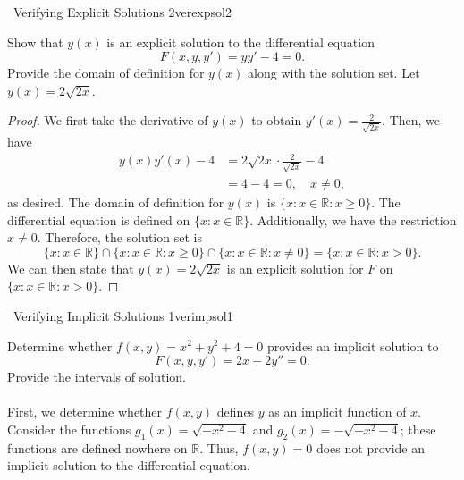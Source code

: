         \begin{example}{\Difficulty\,\Difficulty\,\,Verifying Explicit Solutions 2}{verexpsol2}
        
            Show that \(y(x)\) is an explicit solution to the differential equation
            \begin{equation*}
                F(x,y,y')=yy'-4=0.
            \end{equation*}
            Provide the domain of definition for \(y(x)\) along with the solution set. Let \(y(x)=2\sqrt{2x}\).
            \begin{proof}
                We first take the derivative of \(y(x)\) to obtain \(y'(x)=\frac{2}{\sqrt{2x}}\). Then, we have
                \begin{align*}
                    y(x)y'(x)-4&=2\sqrt{2x}\cdot\frac{2}{\sqrt{2x}}-4 \\
                    &=4-4=0,\quad x\neq0,
                \end{align*}
                as desired. The domain of definition for \(y(x)\) is \(\{x:x\in\mathbb{R}:x\geq0\}\). The differential equation is defined on \(\{x:x\in\mathbb{R}\}\). Additionally, we have the restriction \(x\neq 0\). Therefore, the solution set is 
                \begin{equation*}
                    \{x:x\in\mathbb{R}\}\cap\{x:x\in\mathbb{R}:x\geq0\}\cap\{x:x\in\mathbb{R}:x\neq0\}=\{x:x\in\mathbb{R}:x>0\}.
                \end{equation*}
                We can then state that \(y(x)=2\sqrt{2x}\) is an explicit solution for \(F\) on \(\{x:x\in\mathbb{R}:x>0\}\).
            \end{proof}
            
        \end{example}
        \begin{example}{\Difficulty\,\Difficulty\,\,Verifying Implicit Solutions 1}{verimpsol1}
            
            Determine whether \(f(x,y)=x^2+y^2+4=0\) provides an implicit solution to
            \begin{equation*}
                F(x,y,y')=2x+2y''=0.
            \end{equation*}
            Provide the intervals of solution.
            \\
            \\
            First, we determine whether \(f(x,y)\) defines \(y\) as an implicit function of \(x\). Consider the functions \(g_1(x)=\sqrt{-x^2-4}\) and \(g_2(x)=-\sqrt{-x^2-4}\); these functions are defined nowhere on \(\mathbb{R}\). Thus, \(f(x,y)=0\) does not provide an implicit solution to the differential equation.

        \end{example}
